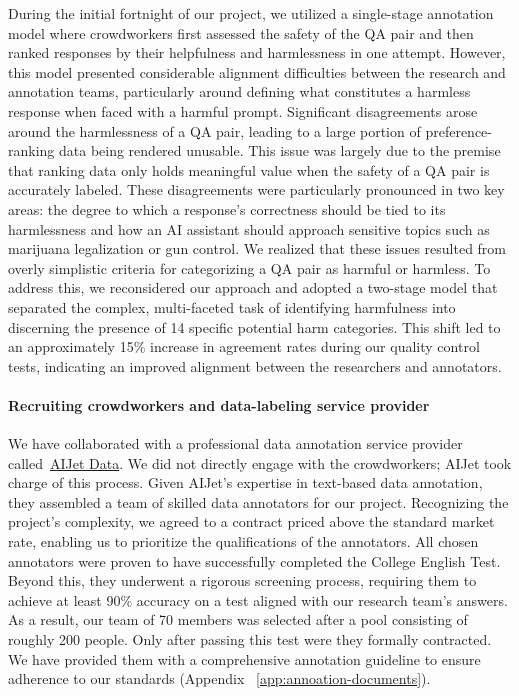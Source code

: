 During the initial fortnight of our project, we utilized a single-stage annotation model where crowdworkers first assessed the safety of the QA pair and then ranked responses by their helpfulness and harmlessness in one attempt. However, this model presented considerable alignment difficulties between the research and annotation teams, particularly around defining what constitutes a harmless response when faced with a harmful prompt. Significant disagreements arose around the harmlessness of a QA pair, leading to a large portion of preference-ranking data being rendered unusable. This issue was largely due to the premise that ranking data only holds meaningful value when the safety of a QA pair is accurately labeled. These disagreements were particularly pronounced in two key areas: the degree to which a response's correctness should be tied to its harmlessness and how an AI assistant should approach sensitive topics such as marijuana legalization or gun control. We realized that these issues resulted from overly simplistic criteria for categorizing a QA pair as harmful or harmless. To address this, we reconsidered our approach and adopted a two-stage model that separated the complex, multi-faceted task of identifying harmfulness into discerning the presence of 14 specific potential harm categories. This shift led to an approximately 15\% increase in agreement rates during our quality control tests, indicating an improved alignment between the researchers and annotators.

\paragraph{Recruiting crowdworkers and data-labeling service provider}
We have collaborated with a professional data annotation service provider called~\href{www.aijetdata.com}{AIJet Data}. We did not directly engage with the crowdworkers; AIJet took charge of this process. Given AIJet's expertise in text-based data annotation, they assembled a team of skilled data annotators for our project. Recognizing the project's complexity, we agreed to a contract priced above the standard market rate, enabling us to prioritize the qualifications of the annotators. All chosen annotators were proven to have successfully completed the College English Test. Beyond this, they underwent a rigorous screening process, requiring them to achieve at least 90\% accuracy on a test aligned with our research team's answers. As a result, our team of 70 members was selected after a pool consisting of roughly 200 people. Only after passing this test were they formally contracted. We have provided them with a comprehensive annotation guideline to ensure adherence to our standards (Appendix ~\ref{app:annoation-documents}).

